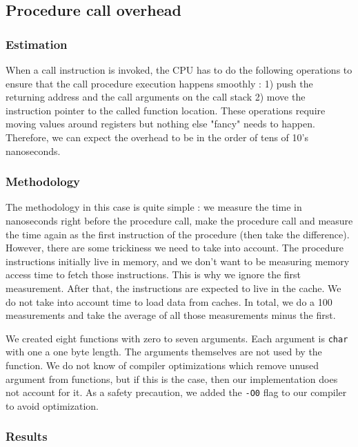 \subsection{Procedure call overhead}

\subsubsection{Estimation}

When a call instruction is invoked, the CPU has to do the following operations to
ensure that the call procedure execution happens smoothly : 1) push the returning
address and the call arguments on the call stack 2) move the instruction pointer to
the called function location. These operations require moving values around registers
but nothing else "fancy" needs to happen. Therefore, we can expect the overhead to
be in the order of tens of 10's nanoseconds.

\subsubsection{Methodology}

The methodology in this case is quite simple : we measure the time in nanoseconds
right before the procedure call, make the procedure call and measure the time again
as the first instruction of the procedure (then take the difference). However, there are some trickiness we need to take
into account. The procedure instructions initially live in memory, and we don't want to be
measuring memory access time to fetch those instructions. This is why we ignore the 
first measurement. After that, the instructions are expected to live in the cache. We do
not take into account time to load data from caches. In total, we do a 100 measurements
and take the average of all those measurements minus the first.

We created eight functions with zero to seven arguments. Each argument is \texttt{char} with one
a one byte length. The arguments themselves are not used
by the function. We do not know of compiler optimizations which remove unused argument from
functions, but if this is the case, then our implementation does not account for it. As a safety 
precaution, we added the \texttt{-O0} flag to our compiler to avoid optimization.

\subsubsection{Results}

